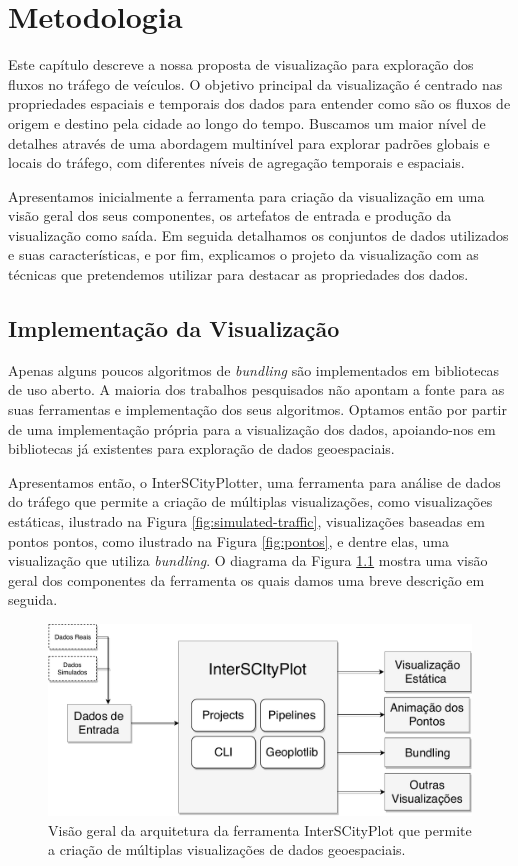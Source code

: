 \chapter{Metodologia}
\label{cap:metodologia}
 Este capítulo descreve a nossa proposta de visualização para exploração dos
fluxos no tráfego de veículos. O objetivo principal da visualização é centrado
nas propriedades espaciais e temporais dos dados para entender como são os
fluxos de origem e destino pela cidade ao longo do tempo. Buscamos um maior
nível de detalhes através de uma abordagem multinível para explorar padrões
globais e locais do tráfego, com diferentes níveis de agregação temporais e
espaciais.

 Apresentamos inicialmente a ferramenta para criação da visualização em uma
visão geral dos seus componentes, os artefatos de entrada e produção da visualização
como saída. Em seguida detalhamos os conjuntos de dados utilizados e suas
características, e por fim, explicamos o projeto da visualização com as técnicas
que pretendemos utilizar para destacar as propriedades dos dados.

\section{Implementação da Visualização}
  Apenas alguns poucos algoritmos de \emph{bundling} são implementados em
bibliotecas de uso aberto. A maioria dos trabalhos pesquisados não apontam
a fonte para as suas ferramentas e implementação dos seus algoritmos. Optamos
então por partir de uma implementação própria para a visualização dos dados,
apoiando-nos em bibliotecas já existentes para exploração de dados geoespaciais. 

  Apresentamos então, o InterSCityPlotter, uma ferramenta para análise de dados
do tráfego que permite a criação de múltiplas visualizações, como visualizações
estáticas, ilustrado na Figura \ref{fig:simulated-traffic}, visualizações
baseadas em pontos pontos, como ilustrado na Figura \ref{fig:pontos}, e dentre
elas, uma visualização que utiliza \emph{bundling}. O diagrama da Figura
\ref{fig:interscityplotter} mostra uma visão geral dos componentes da
ferramenta os quais damos uma breve descrição em seguida.

\begin{figure}[!htb]
  \centering
  \includegraphics[width=1\textwidth]{../figuras/interscityplot.pdf}
  \caption{Visão geral da arquitetura da ferramenta InterSCityPlot que permite a criação
de múltiplas visualizações de dados geoespaciais.}
  \label{fig:interscityplotter}
\end{figure}


